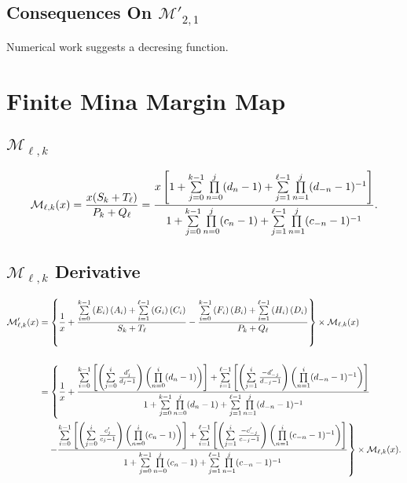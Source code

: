 \documentclass{article}
\begin{document}
\subsection{Consequences On $\mathcal{M}'_{2,1}$}
Numerical work suggests a decresing function.



\newpage
\section{Finite Mina Margin Map}
\subsection{$\mathcal{M}_{\ell,k}$}
$$\mathcal{M}_{\ell,k}(x)=\frac{x(S_k+T_\ell)}{P_k+Q_\ell}=\frac{x\left[1+\sum\limits_{j=0}^{k-1}\prod\limits_{n=0}^{j}(d_n-1)+
\sum\limits_{j=1}^{\ell-1}\prod\limits_{n=1}^{j}(d_{-n}-1)^{-1}\right]}{1+
\sum\limits_{j=0}^{k-1}\prod\limits_{n=0}^j(c_n-1)+
\sum_{j=1}^{\ell-1}\limits\prod_{n=1}^{j}\limits(c_{-n}-1)^{-1}}.$$

\subsection{$\mathcal{M}_{\ell,k}$ Derivative}
\begin{align*}
    \mathcal{M}_{\ell,k}'(x)
    &=\left\{\frac{1}{x}+\frac{
        \sum_{i=0}^{k-1}\limits\left(E_i\right)\left(A_i\right)
        +\sum_{i=1}^{\ell-1}\limits\left(G_i\right)\left(C_i\right)}{S_k + T_\ell} 
    - \frac{
        \sum_{i=0}^{k-1}\limits\left(F_i\right)\left(B_i\right)
        +\sum_{i=1}^{\ell-1}\limits\left(H_i\right)\left(D_i\right)}{P_k+Q_\ell}\right\} 
    \times \mathcal{M}_{\ell,k} (x)\\ \\
    &=\left\{\frac{1}{x}+
    \frac{\sum_{i=0}^{k-1}\limits\left[\left(\sum_{j=0}^{i}\limits\frac{d_j'}{d_j-1}\right)
    \left(\prod_{n=0}^{i}\limits(d_n-1)\right)\right]
    +\sum_{i=1}^{\ell-1}\limits\left[\left(\sum_{j=1}^{i}\limits\frac{-d_{-j}'}{d_{-j}-1}\right)
    \left(\prod_{n=1}^{i}\limits(d_{-n}-1)^{-1}\right)\right]}{1+\sum\limits_{j=0}^{k-1}
    \prod\limits_{n=0}^{j}(d_n-1)+
    \sum\limits_{j=1}^{\ell-1}\prod\limits_{n=1}^{j}(d_{-n}-1)^{-1}}\right. \\
    &\quad \left. - \frac{\sum_{i=0}^{k-1}\limits\left[\left(\sum_{j=0}^{i}\limits\frac{c_j'}{c_j-1}\right)
    \left(\prod_{n=0}^{i}\limits(c_n-1)\right)\right]
    +\sum_{i=1}^{\ell-1}\limits\left[\left(\sum_{j=1}^{i}\limits\frac{-c_{-j}'}{c_{-j}-1}\right)
    \left(\prod_{n=1}^{i}\limits(c_{-n}-1)^{-1}\right)\right]}{1+
    \sum\limits_{j=0}^{k-1}\prod\limits_{n=0}^j(c_n-1)+
    \sum_{j=1}^{\ell-1}\limits\prod_{n=1}^{j}\limits(c_{-n}-1)^{-1}}\right\} \times 
    \mathcal{M}_{\ell,k} (x).
\end{align*}
\end{document}
